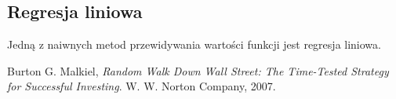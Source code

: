 \documentclass[a4paper, twoside, 11pt, openright]{article}
\begin{document}
\subsection{Regresja liniowa}

Jedną z naiwnych metod przewidywania wartości funkcji jest regresja liniowa. 

\newpage

\renewcommand{\refname}{Bibliografia}
\begin{thebibliography}{9}

  Burton G. Malkiel,
  \textit{Random Walk Down Wall Street: The Time-Tested Strategy for Successful Investing}.
  W. W. Norton Company,
  2007.

\end{thebibliography}
\end{document}
